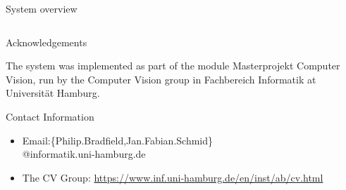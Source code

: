 \documentclass[final]{beamer}
\newlength{\twocolwid}
\begin{document}
\begin{frame}[t]
\begin{columns}[t]
\begin{column}{\twocolwid}
\begin{block}{System overview}
\begin{columns}[c,totalwidth=\twocolwid]
	\end{columns}

	\end{block}
	


	\begin{block}{Acknowledgements}

	\small{The system was implemented as part of the module Masterprojekt Computer Vision, run by the Computer Vision group in Fachbereich Informatik at Universit\"{a}t Hamburg.}

	\end{block}



	\begin{block}{Contact Information}

	\begin{itemize}
		\item Email:\{Philip.Bradfield,Jan.Fabian.Schmid\}\\\hspace{3cm}@informatik.uni-hamburg.de
		\item The CV Group: \href{https://www.inf.uni-hamburg.de/en/inst/ab/cv.html}{https://www.inf.uni-hamburg.de/en/inst/ab/cv.html}
	\end{itemize}



\end{block}
\end{column}
\end{columns}
\end{frame}
\end{document}

